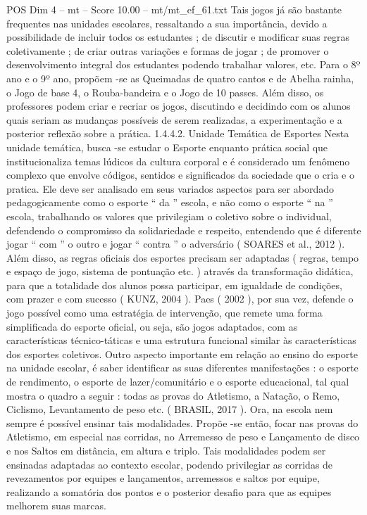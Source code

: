 \begin{textsample}{POS Dim 4 – mt – Score 10.00 – mt/mt\_ef\_61.txt}
Tais jogos já são bastante frequentes nas unidades escolares, ressaltando a sua importância, devido a possibilidade de incluir todos os estudantes ; de discutir e modificar suas regras coletivamente ; de criar outras variações e formas de jogar ; de promover o desenvolvimento integral dos estudantes podendo trabalhar valores, etc.
Para o 8º ano e o 9º ano, propõem -se as Queimadas de quatro cantos e de Abelha rainha, o Jogo de base 4, o Rouba-bandeira e o Jogo de 10 passes.
Além disso, os professores podem criar e recriar os jogos, discutindo e decidindo com os alunos quais seriam as mudanças possíveis de serem realizadas, a experimentação e a posterior reflexão sobre a prática. 1.4.4.2.
Unidade Temática de Esportes Nesta unidade temática, busca -se estudar o Esporte enquanto prática social que institucionaliza temas lúdicos da cultura corporal e é considerado um fenômeno complexo que envolve códigos, sentidos e significados da sociedade que o cria e o pratica.
Ele deve ser analisado em seus variados aspectos para ser abordado pedagogicamente como o esporte “ da ” escola, e não como o esporte “ na ” escola, trabalhando os valores que privilegiam o coletivo sobre o individual, defendendo o compromisso da solidariedade e respeito, entendendo que é diferente jogar “ com ” o outro e jogar “ contra ” o adversário ( SOARES et al., 2012 ).
Além disso, as regras oficiais dos esportes precisam ser adaptadas ( regras, tempo e espaço de jogo, sistema de pontuação etc. ) através da transformação didática, para que a totalidade dos alunos possa participar, em igualdade de condições, com prazer e com sucesso ( KUNZ, 2004 ).
Paes ( 2002 ), por sua vez, defende o jogo possível como uma estratégia de intervenção, que remete uma forma simplificada do esporte oficial, ou seja, são jogos adaptados, com as características técnico-táticas e uma estrutura funcional similar às características dos esportes coletivos.
Outro aspecto importante em relação ao ensino do esporte na unidade escolar, é saber identificar as suas diferentes manifestações : o esporte de rendimento, o esporte de lazer/comunitário e o esporte educacional, tal qual mostra o quadro a seguir : todas as provas do Atletismo, a Natação, o Remo, Ciclismo, Levantamento de peso etc. ( BRASIL, 2017 ).
Ora, na escola nem sempre é possível ensinar tais modalidades.
Propõe -se então, focar nas provas do Atletismo, em especial nas corridas, no Arremesso de peso e Lançamento de disco e nos Saltos em distância, em altura e triplo.
Tais modalidades podem ser ensinadas adaptadas ao contexto escolar, podendo privilegiar as corridas de revezamentos por equipes e lançamentos, arremessos e saltos por equipe, realizando a somatória dos pontos e o posterior desafio para que as equipes melhorem suas marcas.

\end{textsample}
